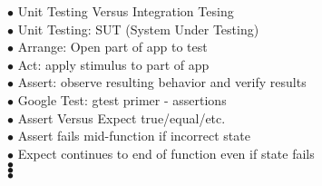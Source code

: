 \documentclass[11pt]{article}
\begin{document}
\indent $\bullet$ Unit Testing Versus Integration Tesing \\
\indent\indent $\bullet$ Unit Testing: SUT (System Under Testing)\\
\indent\indent\indent  $\bullet$ Arrange: Open part of app to test\\ 
\indent\indent\indent  $\bullet$ Act: apply stimulus to part of app \\
\indent\indent\indent  $\bullet$ Assert: observe resulting behavior and verify results  \\
\indent\indent $\bullet$ Google Test: gtest primer - assertions \\
\indent\indent $\bullet$ Assert Versus Expect true/equal/etc. \\
\indent\indent\indent $\bullet$ Assert fails mid-function if incorrect state \\
\indent\indent\indent $\bullet$ Expect continues to end of function even if state fails \\
\indent\indent $\bullet$  \\
\indent\indent $\bullet$  \\
\indent\indent $\bullet$


    
\end{document}
